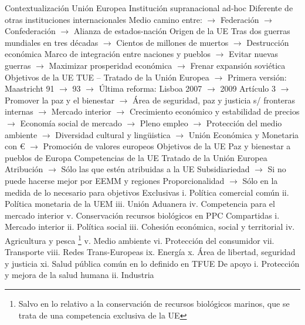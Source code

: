 \documentclass{nuevotema}
\begin{document}
\begin{esquemal}
	\1[] 
		\2 Contextualización
			\3 Unión Europea
				\4 Institución supranacional ad-hoc
				\4[] Diferente de otras instituciones internacionales
				\4[] Medio camino entre:
				\4[] $\to$ Federación
				\4[] $\to$ Confederación
				\4[] $\to$ Alianza de estados-nación
				\4 Origen de la UE
				\4[] Tras dos guerras mundiales en tres décadas
				\4[] $\to$ Cientos de millones de muertos
				\4[] $\to$ Destrucción económica
				\4[] Marco de integración entre naciones y pueblos
				\4[] $\to$ Evitar nuevas guerras
				\4[] $\to$ Maximizar prosperidad económica
				\4[] $\to$ Frenar expansión soviética
				\4 Objetivos de la UE
				\4[] TUE -- Tratado de la Unión Europea
				\4[] $\to$ Primera versión: Maastricht 91 $\to$ 93
				\4[] $\to$ Última reforma: Lisboa 2007 $\to$ 2009
				\4[] Artículo 3
				\4[] $\to$ Promover la paz y el bienestar
				\4[] $\to$ Área de seguridad, paz y justicia s/ fronteras internas
				\4[] $\to$ Mercado interior
				\4[] $\to$ Crecimiento económico y estabilidad de precios
				\4[] $\to$ Economía social de mercado
				\4[] $\to$ Pleno empleo
				\4[] $\to$ Protección del medio ambiente
				\4[] $\to$ Diversidad cultural y lingüistica
				\4[] $\to$ Unión Económica y Monetaria con €
				\4[] $\to$ Promoción de valores europeos
				\4[$\to$] Objetivos de la UE
				\4[] Paz y bienestar a pueblos de Europa
			\3 Competencias de la UE
				\4 Tratado de la Unión Europea
				\4[] Atribución
				\4[] $\to$ Sólo las que estén atribuidas a la UE
				\4[] Subsidiariedad
				\4[] $\to$ Si no puede hacerse mejor por EEMM y regiones
				\4[] Proporcionalidad
				\4[] $\to$ Sólo en la medida de lo necesario para objetivos
				\4 Exclusivas
				\4[] i. Política comercial común
				\4[] ii. Política monetaria de la UEM
				\4[] iii. Unión Aduanera
				\4[] iv. Competencia para el mercado interior
				\4[] v. Conservación recursos biológicos en PPC
				\4 Compartidas
				\4[] i. Mercado interior
				\4[] ii. Política social
				\4[] iii. Cohesión económica, social y territorial
				\4[] iv. Agricultura y pesca \footnote{Salvo en lo relativo a la conservación de recursos biológicos marinos, que se trata de una competencia exclusiva de la UE}
				\4[] v. Medio ambiente
				\4[] vi. Protección del consumidor
				\4[] vii. Transporte
				\4[] viii. Redes Trans-Europeas
				\4[] ix. Energía
				\4[] x. Área de libertad, seguridad y justicia
				\4[] xi. Salud pública común en lo definido en TFUE
				\4 De apoyo
				\4[] i. Protección y mejora de la salud humana
				\4[] ii. Industria

\end{esquemal}
\end{document}
